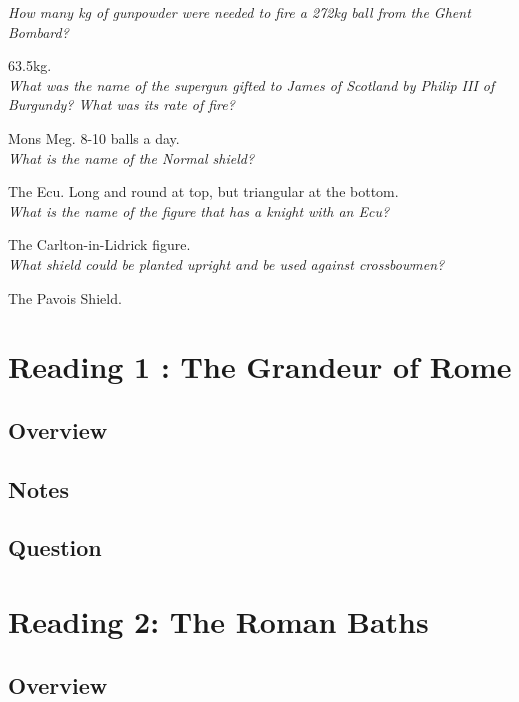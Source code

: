 \documentclass[12pt]{article}
\begin{document}
{\textit{How many kg of gunpowder were needed to fire a 272kg ball from the Ghent Bombard?}

63.5kg.\\

\textit{What was the name of the supergun gifted to James of Scotland by Philip III of Burgundy? What was its rate of fire?}

Mons Meg. 8-10 balls a day.\\

\textit{What is the name of the Normal shield?}

The Ecu. Long and round at top, but triangular at the bottom.\\

\textit{What is the name of the figure that has a knight with an Ecu?}

The Carlton-in-Lidrick figure.\\

\textit{What shield could be planted upright and be used against crossbowmen?}

The Pavois Shield.\\














\section*{Reading 1 : The Grandeur of Rome}

\subsection*{Overview}

\subsection*{Notes}

\subsection*{Question}

\section*{Reading 2: The Roman Baths}

\subsection*{Overview}

}
\end{document}
